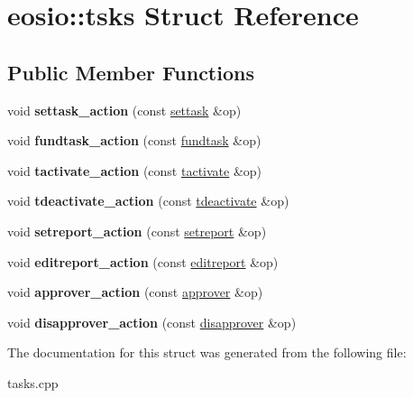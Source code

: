 \hypertarget{structeosio_1_1tsks}{}\section{eosio\+:\+:tsks Struct Reference}
\label{structeosio_1_1tsks}
\subsection*{Public Member Functions}
\begin{DoxyCompactItemize}
\item 
\mbox{\label{structeosio_1_1tsks_a36b4b16563aee29ef3af8af63a8aec1f}} 
void {\bfseries settask\+\_\+action} (const \mbox{\hyperlink{structeosio_1_1settask}{settask}} \&op)
\item 
\mbox{\label{structeosio_1_1tsks_af5c40f1675c91ade36ac34d105e6a8e3}} 
void {\bfseries fundtask\+\_\+action} (const \mbox{\hyperlink{structeosio_1_1fundtask}{fundtask}} \&op)
\item 
\mbox{\label{structeosio_1_1tsks_ad6ccc424854393d8871818961bca6787}} 
void {\bfseries tactivate\+\_\+action} (const \mbox{\hyperlink{structeosio_1_1tactivate}{tactivate}} \&op)
\item 
\mbox{\label{structeosio_1_1tsks_aca63fc18e2ceea00bdc6e438ce751e28}} 
void {\bfseries tdeactivate\+\_\+action} (const \mbox{\hyperlink{structeosio_1_1tdeactivate}{tdeactivate}} \&op)
\item 
\mbox{\label{structeosio_1_1tsks_a83745c040c6a12dddcd9063865b81caa}} 
void {\bfseries setreport\+\_\+action} (const \mbox{\hyperlink{structeosio_1_1setreport}{setreport}} \&op)
\item 
\mbox{\label{structeosio_1_1tsks_aadd8eeb3a74a671e2fa30e38ba73baee}} 
void {\bfseries editreport\+\_\+action} (const \mbox{\hyperlink{structeosio_1_1editreport}{editreport}} \&op)
\item 
\mbox{\label{structeosio_1_1tsks_a1ec801c9cab2c613ba6e4a8e005e3c0c}} 
void {\bfseries approver\+\_\+action} (const \mbox{\hyperlink{structeosio_1_1approver}{approver}} \&op)
\item 
\mbox{\label{structeosio_1_1tsks_a13940dec55cf59369111aa1a1ac9b2e9}} 
void {\bfseries disapprover\+\_\+action} (const \mbox{\hyperlink{structeosio_1_1disapprover}{disapprover}} \&op)
\end{DoxyCompactItemize}


The documentation for this struct was generated from the following file\+:\begin{DoxyCompactItemize}
\item 
tasks.\+cpp\end{DoxyCompactItemize}
